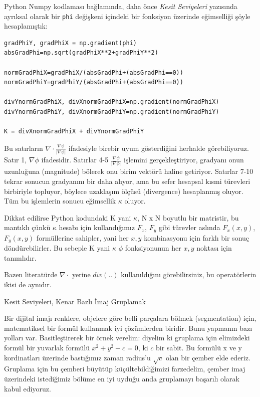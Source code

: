 \documentclass[12pt,fleqn]{article}\usepackage{../../common}
\begin{document}
Python Numpy kodlaması bağlamında, daha önce {\em Kesit Seviyeleri} yazısında
ayrıksal olarak bir \verb!phi! değişkeni içindeki bir fonksiyon üzerinde
eğimselliği şöyle hesaplamıştık:


\begin{verbatim}
gradPhiY, gradPhiX = np.gradient(phi)
absGradPhi=np.sqrt(gradPhiX**2+gradPhiY**2)                               

normGradPhiX=gradPhiX/(absGradPhi+(absGradPhi==0))
normGradPhiY=gradPhiY/(absGradPhi+(absGradPhi==0))

divYnormGradPhiX, divXnormGradPhiX=np.gradient(normGradPhiX)
divYnormGradPhiY, divXnormGradPhiY=np.gradient(normGradPhiY)
                       
K = divXnormGradPhiX + divYnormGradPhiY
\end{verbatim}

Bu satırların $\nabla \cdot \frac{\nabla \phi}{|\nabla \phi|}$ ifadesiyle
birebir uyum gösterdiğini herhalde görebiliyoruz. Satır 1, $\nabla \phi$
ifadesidir. Satırlar 4-5 $\frac{\nabla \phi}{|\nabla \phi|}$ işlemini
gerçekleştiriyor, gradyanı onun uzunluğuna (magnitude) bölerek onu birim vektörü
haline getiriyor. Satırlar 7-10 tekrar sonucun gradyanını bir daha alıyor, ama
bu sefer hesapsal kısmi türevleri birbiriyle topluyor, böylece uzaklaşım ölçüsü
(divergence) hesaplanmış oluyor. Tüm bu işlemlerin sonucu eğimsellik $\kappa$
oluyor.

Dikkat edilirse Python kodundaki K yani $\kappa$, N x N boyutlu bir matristir,
bu mantıklı çünkü $\kappa$ hesabı için kullandığımız $F_x$, $F_y$ gibi
türevler aslında $F_x(x,y)$, $F_y(x,y)$ formüllerine sahipler, yani her $x,y$
kombinasyonu için farklı bir sonuç döndürebilirler. Bu sebeple K yani $\kappa$
$\phi$ fonksiyonunun her $x,y$ noktası için tanımlıdır. 

Bazen literatürde $\nabla \cdot$ yerine $div(..)$ kullanıldığını görebilirsiniz,
bu operatörlerin ikisi de aynıdır.

Kesit Seviyeleri, Kenar Bazlı İmaj Gruplamak

Bir dijital imajı renklere, objelere göre belli parçalara bölmek
(segmentation) için, matematiksel bir formül kullanmak iyi çözümlerden
biridir. Bunu yapmanın bazı yolları var. Basitleştirerek bir örnek
verelim: diyelim ki gruplama için elimizdeki formül bir yuvarlak
formülü $x^2+y^2 - c = 0$, ki $c$ bir sabit. Bu formülü x ve y
kordinatları üzerinde bastığımız zaman radius'u $\sqrt{c}$ olan bir
çember elde ederiz. Gruplama için bu çemberi büyütüp
küçültebildiğimizi farzedelim, çember imaj üzerindeki istediğimiz
bölüme en iyi uyduğu anda gruplamayı başarılı olarak kabul ediyoruz.
\end{document}
